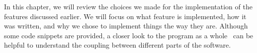 In this chapter, we will review the choices we made for the implementation of the features discussed earlier. We will focus on what feature is implemented, how it was written, and why we chose to implement things the way they are. Although some code snippets are provided, a closer look to the program as a whole~\cite{j-levy:bwa-gasal2} can be helpful to understand the coupling between different parts of the software.